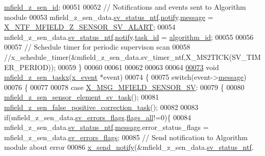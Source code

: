 \begin{DoxyCode}
      \hyperlink{a00053_a8b08b70b0141a3a5c4b0f6097b49d437}{mfield\_z\_sen\_id};
00051 
00052     \textcolor{comment}{// Notifications and events sent to Algorithm module}
00053     mfield\_z\_sen\_data.\hyperlink{a00027_a752b00333ec308e07c6bd41aa9a01e73}{sv\_status\_ntf}.\hyperlink{a00019_a8e6a04c2283f9fd7b8dcbc62faba5847}{notify}.\hyperlink{a00036_adf9665938515a20c283eea2c978cf80d}{message}                     = 
      \hyperlink{a00021_aa1f79c63c45b8a4022e580c676d95627}{X\_NTF\_MFIELD\_Z\_SENSOR\_SV\_ALART};
00054     mfield\_z\_sen\_data.\hyperlink{a00027_a752b00333ec308e07c6bd41aa9a01e73}{sv\_status\_ntf}.\hyperlink{a00019_a8e6a04c2283f9fd7b8dcbc62faba5847}{notify}.\hyperlink{a00036_a21b41e494a28583d4da10f1afb1c5328}{task\_id}                 = 
      \hyperlink{a00021_aff3e3d622fcd96787628167d3c1856f9}{algorithm\_id};
00055 
00056 
00057     \textcolor{comment}{// Schedule timer for periodic supervison scan}
00058     \textcolor{comment}{//x\_schedule\_timer(&mfield\_z\_sen\_data.sv\_timer\_ntf,X\_MS2TICK(SV\_TIMER\_PERIOD));}
00059 \}
00060 
00061 
00062 
00063 
00064 
\hypertarget{a00053_source_l00073}{}\hyperlink{a00053_a7ef08302978421a5dc004f06aab80a8a}{00073} \textcolor{keywordtype}{void} \hyperlink{a00053_a7ef08302978421a5dc004f06aab80a8a}{mfield\_z\_sen\_taskx}(\hyperlink{a00036_de/d37/a00849}{x\_event} *event)
00074 \{
00075     \textcolor{keywordflow}{switch}(event->\hyperlink{a00036_adf9665938515a20c283eea2c978cf80d}{message})
00076     \{
00077 
00078         \textcolor{keywordflow}{case} \hyperlink{a00025_a510020575747f82c587c5485b8619f78}{X\_MSG\_MFIELD\_SENSOR\_SV}:
00079         \{
00080             \hyperlink{a00053_ab3b441646e86a6cf6ddfe83c1af4e075}{mfield\_z\_sen\_sensor\_element\_sv\_task}();
00081             \hyperlink{a00053_a36a65e3e838c4f7be43267a10532d318}{mfield\_z\_sen\_false\_positive\_correction\_task}();
00082 
00083             \textcolor{keywordflow}{if}(mfield\_z\_sen\_data.\hyperlink{a00027_aaeec6b0609dba31393f337abf1cce3d3}{sv\_errors\_flags}.\hyperlink{a00022_a1caa87b00c878186140c3bac9c8acf3b}{flags\_all}!=0)\{
00084              mfield\_z\_sen\_data.\hyperlink{a00027_a752b00333ec308e07c6bd41aa9a01e73}{sv\_status\_ntf}.\hyperlink{a00019_a946af134546e64739ccfd37633480dc2}{message}.error\_status\_flags = 
      mfield\_z\_sen\_data.\hyperlink{a00027_aaeec6b0609dba31393f337abf1cce3d3}{sv\_errors\_flags};
00085              \textcolor{comment}{// Send notification to Algorithm module about error}
00086              \hyperlink{a00036_ae17b0bb16da3c471bb6074bb4c4d0fee}{x\_send\_notify}(&mfield\_z\_sen\_data.\hyperlink{a00027_a752b00333ec308e07c6bd41aa9a01e73}{sv\_status\_ntf}.

\end{DoxyCode}
